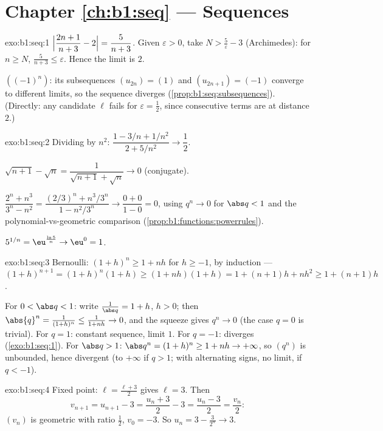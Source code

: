 \section*{Chapter \ref{ch:b1:seq} --- Sequences}

\begin{solution}{exo:b1:seq:1}
$\Bigl|\dfrac{2n+1}{n+3} - 2\Bigr| = \dfrac{5}{n+3}$. Given
$\varepsilon > 0$, take $N > \frac 5\varepsilon - 3$ (Archimedes):
for $n \geq N$, $\frac{5}{n+3} \leq \varepsilon$. Hence the limit is
$2$.

$((-1)^n)$: its subsequences $(u_{2n}) = (1)$ and $(u_{2n+1}) =
(-1)$ converge to different limits, so the sequence diverges
(\cref{prop:b1:seq:subsequences}). (Directly: any candidate $\ell$
fails for $\varepsilon = \frac12$, since consecutive terms are at
distance $2$.)
\end{solution}

\begin{solution}{exo:b1:seq:2}
Dividing by $n^2$: $\dfrac{1 - 3/n + 1/n^2}{2 + 5/n^2} \to
\dfrac12$.

$\sqrt{n+1} - \sqrt n = \dfrac{1}{\sqrt{n+1} + \sqrt n} \to 0$
(conjugate).

$\dfrac{2^n + n^3}{3^n - n^2} = \dfrac{(2/3)^n + n^3/3^n}{1 -
n^2/3^n} \to \dfrac{0 + 0}{1 - 0} = 0$, using $q^n \to 0$ for $\abs q
< 1$ and the polynomial-vs-geometric comparison
(\cref{prop:b1:functions:powerrules}).

$5^{1/n} = \eu^{\frac{\ln 5}{n}} \to \eu^0 = 1$.
\end{solution}

\begin{solution}{exo:b1:seq:3}
Bernoulli: $(1+h)^n \geq 1 + nh$ for $h \geq -1$, by induction ---
$(1+h)^{n+1} = (1+h)^n(1+h) \geq (1+nh)(1+h) = 1 + (n+1)h + nh^2
\geq 1 + (n+1)h$.

For $0 < \abs q < 1$: write $\frac{1}{\abs q} = 1 + h$, $h > 0$; then
$\abs{q}^n = \frac{1}{(1+h)^n} \leq \frac{1}{1 + nh} \to 0$, and the
squeeze gives $q^n \to 0$ (the case $q = 0$ is trivial). For $q = 1$:
constant sequence, limit $1$. For $q = -1$: diverges
(\cref{exo:b1:seq:1}). For $\abs q > 1$: $\abs q^n = (1 + h)^n \geq
1 + nh \to +\infty$, so $(q^n)$ is unbounded, hence divergent (to
$+\infty$ if $q > 1$; with alternating signs, no limit, if $q <
-1$).
\end{solution}

\begin{solution}{exo:b1:seq:4}
Fixed point: $\ell = \frac{\ell + 3}{2}$ gives $\ell = 3$. Then
\[
v_{n+1} = u_{n+1} - 3 = \frac{u_n + 3}{2} - 3 = \frac{u_n - 3}{2} =
\frac{v_n}{2}:
\]
$(v_n)$ is geometric with ratio $\frac12$, $v_0 = -3$. So $u_n = 3 -
\frac{3}{2^n} \to 3$.
\end{solution}

